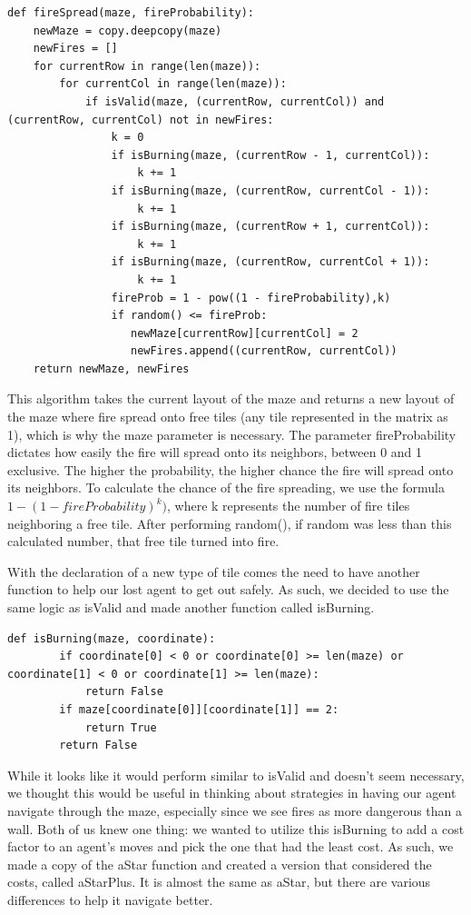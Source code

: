 \documentclass[11pt]{article}
\begin{document}
\begin{verbatim}
def fireSpread(maze, fireProbability):
    newMaze = copy.deepcopy(maze)
    newFires = []
    for currentRow in range(len(maze)):
        for currentCol in range(len(maze)):
            if isValid(maze, (currentRow, currentCol)) and (currentRow, currentCol) not in newFires:
                k = 0
                if isBurning(maze, (currentRow - 1, currentCol)):
                    k += 1
                if isBurning(maze, (currentRow, currentCol - 1)):
                    k += 1
                if isBurning(maze, (currentRow + 1, currentCol)):
                    k += 1
                if isBurning(maze, (currentRow, currentCol + 1)):
                    k += 1
                fireProb = 1 - pow((1 - fireProbability),k)
                if random() <= fireProb:
                   newMaze[currentRow][currentCol] = 2
                   newFires.append((currentRow, currentCol))
    return newMaze, newFires
\end{verbatim}

This algorithm takes the current layout of the maze and returns a new layout of the maze where fire spread onto free tiles (any tile represented in the matrix as 1), which is why the maze parameter is necessary. The parameter fireProbability dictates how easily the fire will spread onto its neighbors, between 0 and 1 exclusive. The higher the probability, the higher chance the fire will spread onto its neighbors. To calculate the chance of the fire spreading, we use the formula $1 - (1 - fireProbability)^k)$, where k represents the number of fire tiles neighboring a free tile. After performing random(), if random was less than this calculated number, that free tile turned into fire.

With the declaration of a new type of tile comes the need to have another function to help our lost agent to get out safely. As such, we decided to use the same logic as isValid and made another function called isBurning.

\begin{verbatim}
def isBurning(maze, coordinate):
        if coordinate[0] < 0 or coordinate[0] >= len(maze) or coordinate[1] < 0 or coordinate[1] >= len(maze):
            return False
        if maze[coordinate[0]][coordinate[1]] == 2:
            return True
        return False
\end{verbatim}

While it looks like it would perform similar to isValid and doesn't seem necessary, we thought this would be useful in thinking about strategies in having our agent navigate through the maze, especially since we see fires as more dangerous than a wall. Both of us knew one thing: we wanted to utilize this isBurning to add a cost factor to an agent's moves and pick the one that had the least cost. As such, we made a copy of the aStar function and created a version that considered the costs, called aStarPlus. It is almost the same as aStar, but there are various differences to help it navigate better.
\end{document}
